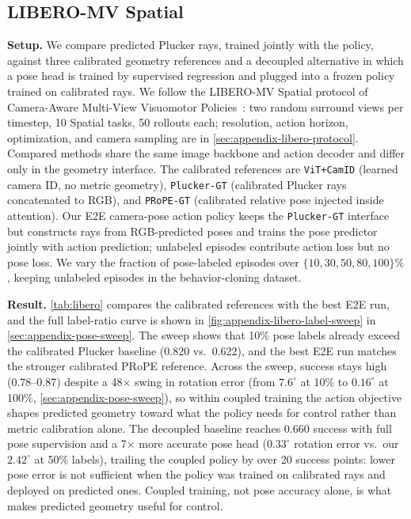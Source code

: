 \subsection{LIBERO-MV Spatial}

\textbf{Setup.} We compare predicted Plucker rays, trained jointly with the policy, against three calibrated geometry references and a decoupled alternative in which a pose head is trained by supervised regression and plugged into a frozen policy trained on calibrated rays. We follow the LIBERO-MV Spatial protocol of Camera-Aware Multi-View Visuomotor Policies~\citep{anonymous2026cameraaware}: two random surround views per timestep, 10 Spatial tasks, 50 rollouts each; resolution, action horizon, optimization, and camera sampling are in \autoref{sec:appendix-libero-protocol}. Compared methods share the same image backbone and action decoder and differ only in the geometry interface. The calibrated references are \texttt{ViT+CamID} (learned camera ID, no metric geometry), \texttt{Plucker-GT} (calibrated Plucker rays concatenated to RGB), and \texttt{PRoPE-GT} (calibrated relative pose injected inside attention). Our E2E camera-pose action policy keeps the \texttt{Plucker-GT} interface but constructs rays from RGB-predicted poses and trains the pose predictor jointly with action prediction; unlabeled episodes contribute action loss but no pose loss. We vary the fraction of pose-labeled episodes over \(\{10, 30, 50, 80, 100\}\%\), keeping unlabeled episodes in the behavior-cloning dataset.

\textbf{Result.} \autoref{tab:libero} compares the calibrated references with
the best E2E run, and the full label-ratio curve is shown in
\autoref{fig:appendix-libero-label-sweep} in \autoref{sec:appendix-pose-sweep}.
The sweep shows that 10\% pose labels already exceed the calibrated Plucker
baseline (0.820 vs.\ 0.622), and the best E2E run matches the stronger
calibrated PRoPE reference. Across the sweep, success stays high (0.78--0.87)
despite a 48\(\times\) swing in rotation error (from \(7.6^\circ\) at 10\% to
\(0.16^\circ\) at 100\%, \autoref{sec:appendix-pose-sweep}), so within coupled
training the action objective shapes predicted geometry toward what the policy
needs for control rather than metric calibration alone. The decoupled baseline
reaches \(0.660\) success with full pose supervision and a 7\(\times\) more
accurate pose head (\(0.33^\circ\) rotation error vs.\ our \(2.42^\circ\) at
50\% labels), trailing the coupled policy by over 20 success points: lower pose
error is not sufficient when the policy was trained on calibrated rays and
deployed on predicted ones. Coupled training, not pose accuracy alone, is what
makes predicted geometry useful for control.

